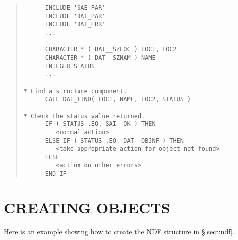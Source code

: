 \documentclass[11pt]{article}
\newcommand{\xlabel}[1]{}
\begin{document}
\small
\begin{quote}
\begin{verbatim}
      INCLUDE 'SAE_PAR'
      INCLUDE 'DAT_PAR'
      INCLUDE 'DAT_ERR'
      ...

      CHARACTER * ( DAT__SZLOC ) LOC1, LOC2
      CHARACTER * ( DAT__SZNAM ) NAME
      INTEGER STATUS
      ...

* Find a structure component.
      CALL DAT_FIND( LOC1, NAME, LOC2, STATUS )

* Check the status value returned.
      IF ( STATUS .EQ. SAI__OK ) THEN
         <normal action>
      ELSE IF ( STATUS .EQ. DAT__OBJNF ) THEN
         <take appropriate action for object not found>
      ELSE
         <action on other errors>
      END IF
\end{verbatim}
\end{quote}
\normalsize

\section{\xlabel{creating_objects}\label{sect:creating}CREATING OBJECTS}

Here is an example showing how to create the NDF structure in
\S\ref{sect:ndf}.
\end{document}
